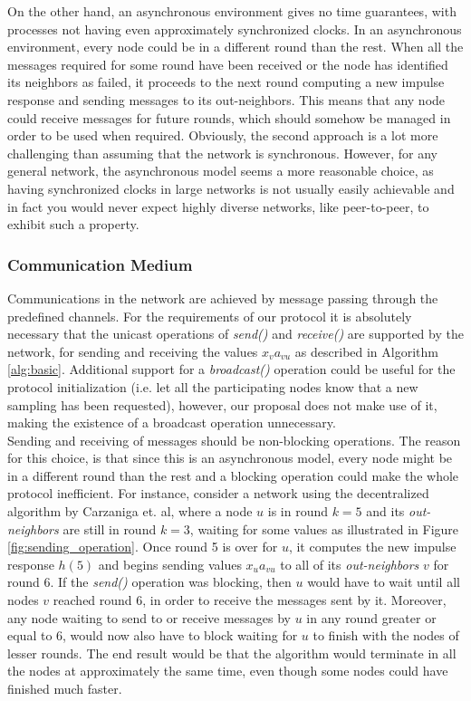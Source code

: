 \documentclass[a4paper,11pt,twoside]{report}
\begin{document}
On the other hand, an asynchronous environment gives no time guarantees, with processes not having even approximately synchronized clocks. In an asynchronous environment, every node could be in a different round than the rest. When all the messages required for some round have been received or the node has identified its neighbors as failed, it proceeds to the next round computing a new impulse response and sending messages to its out-neighbors. This means that any node could receive messages for future rounds, which should somehow be managed in order to be used when required. Obviously, the second approach is a lot more challenging than assuming that the network is synchronous. However, for any general network, the asynchronous model seems a more reasonable choice, as having synchronized clocks in large networks is not usually easily achievable and in fact you would never expect highly diverse networks, like peer-to-peer, to exhibit such a property. \\

\subsubsection*{Communication Medium}

Communications in the network are achieved by message passing through the predefined channels. For the requirements of our protocol it is absolutely necessary that the unicast operations of \textit{send()} and \textit{receive()} are supported by the network, for sending and receiving the values $x_va_{vu}$ as described in Algorithm \ref{alg:basic}. Additional support for a \textit{broadcast()} operation could be useful for the protocol initialization (i.e. let all the participating nodes know that a new sampling has been requested), however, our proposal does not make use of it, making the existence of a broadcast operation unnecessary.\\

Sending and receiving of messages should be non-blocking operations. The reason for this choice, is that since this is an asynchronous model, every node might be in a different round than the rest and a blocking operation could make the whole protocol inefficient. For instance, consider a network using the decentralized algorithm by Carzaniga et. al, where a node $u$ is in round $k=5$ and its \textit{out-neighbors} are still in round $k=3$, waiting for some values as illustrated in Figure \ref{fig:sending_operation}. Once round 5 is over for $u$, it computes the new impulse response $h(5)$ and begins sending values $x_ua_{vu}$ to all of its \textit{out-neighbors} $v$ for round 6. If the \textit{send()} operation was blocking, then $u$ would have to wait until all nodes $v$ reached round 6, in order to receive the messages sent by it. Moreover, any node waiting to send to or receive messages by $u$ in any round greater or equal to 6, would now also have to block waiting for $u$ to finish with the nodes of lesser rounds. The end result would be that the algorithm would terminate in all the nodes at approximately the same time, even though some nodes could have finished much faster. \\
\end{document}
